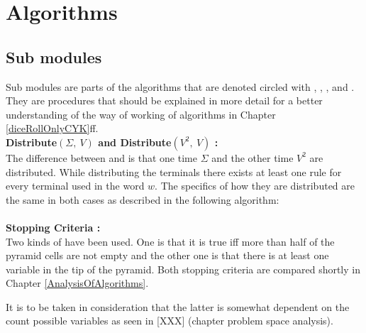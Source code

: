 
\section{Algorithms}\label{algorithms}
\subsection{Sub modules}
Sub modules are parts of the algorithms that are denoted circled with , , ,  and . They are procedures that should be explained in more detail for a better understanding of the way of working of algorithms in Chapter \ref{diceRollOnlyCYK}ff.\\

\noindent \textbf{Distribute$(\Sigma,\ V) $  and Distribute$(V^2,\ V)$ :}\\
The difference between  and  is that one time $\Sigma$ and the other time $V^2$ are distributed. While distributing the terminals there exists at least one rule for every terminal used in the word $w$. The specifics of how they are distributed are the same in both cases as described in the following algorithm: \\

\noindent
{} \\

\noindent \textbf{Stopping Criteria :}\\
Two kinds of  have been used. One is that it is true iff more than half of the pyramid cells are not empty and the other one is that there is at least one variable in the tip of the pyramid. Both stopping criteria are compared shortly in Chapter \ref{AnalysisOfAlgorithms}.

It is to be taken in consideration that the latter is somewhat dependent on the count possible variables as seen in [XXX] (chapter problem space analysis). \\

